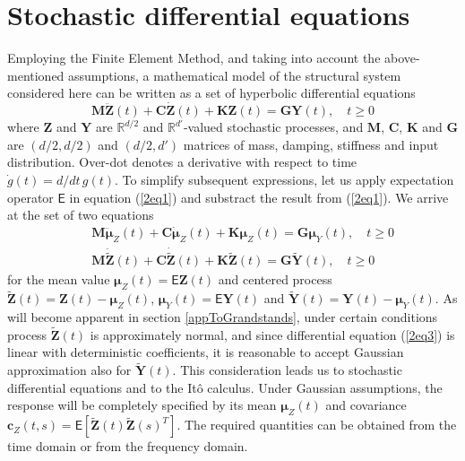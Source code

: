 \documentclass[preprint,12pt,authoryear]{elsarticle}
\newcommand{\bs}[1]{{\boldsymbol{#1}}}
\begin{document}
\section{Stochastic differential equations}
\label{SDE}
Employing the Finite Element Method, and taking into account the above-mentioned assumptions, a mathematical model of the structural system considered here can be written as a set of hyperbolic differential equations
\begin{equation}
\bs{M}\bs{\ddot{Z}}(t)+\bs{C}\bs{\dot{Z}}(t)+\bs{K}\bs{Z}(t)=\bs{GY}(t),\quad t\geq 0
\label{2eq1}
\end{equation}
where $\bs{Z}$ and $\bs{Y}$ are $\mathbb{R}^{d/2}$ and $\mathbb{R}^{d'}$-valued stochastic processes, and $\bs{M}$, $\bs{C}$, $\bs{K}$ and $\bs{G}$ are $(d/2,d/2)$ and $(d/2,d')$ matrices of mass, damping, stiffness and input distribution. Over-dot denotes a derivative with respect to time $\dot{g}(t)=d/dt\,g(t)$. To simplify subsequent expressions, let us apply expectation operator $\mathsf{E}$ in equation (\ref{2eq1}) and substract the result from (\ref{2eq1}). We arrive at the set of two equations
\begin{eqnarray}
&&\bs{M}\bs{\ddot{\mu}}_Z(t)+\bs{C}\bs{\dot{\mu}}_Z(t)+\bs{K}\bs{\mu}_Z(t)=\bs{G\mu}_Y(t),\quad t\geq 0\label{2eq2}\\
&&\bs{M}\bs{\ddot{\tilde{Z}}}(t)+\bs{C}\bs{\dot{\tilde{Z}}}(t)+\bs{K}\bs{\tilde{Z}}(t)=\bs{G\tilde{Y}}(t),\quad t\geq 0\label{2eq3}
\end{eqnarray}
for the mean value $\bs{\mu}_Z(t)=\mathsf{E}\bs{Z}(t)$ and centered process $\bs{\tilde{Z}}(t)=\bs{Z}(t)-\bs{\mu}_Z(t)$, $\bs{\mu}_Y(t)=\mathsf{E}\bs{Y}(t)$ and $\bs{\tilde{Y}}(t)=\bs{Y}(t)-\bs{\mu}_Y(t)$. As will become apparent in section \ref{appToGrandstands}, under certain conditions process $\bs{\tilde{Z}}(t)$ is approximately normal, and since differential equation (\ref{2eq3}) is linear with deterministic coefficients, it is reasonable to accept Gaussian approximation also for $\bs{\tilde{Y}}(t)$. This consideration leads us to stochastic differential equations and to the It\^{o} calculus. Under Gaussian assumptions, the response will be completely specified by its mean $\bs{\mu}_Z(t)$ and covariance $\bs{c}_Z(t,s)=\mathsf{E}[\bs{\tilde{Z}}(t)\bs{\tilde{Z}}(s)^T]$. The required quantities can be obtained from the time domain or from the frequency domain.
\end{document}
